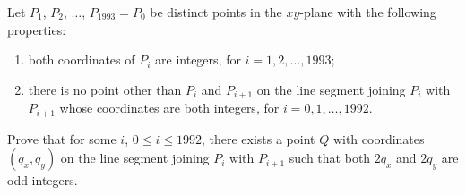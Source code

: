 Let $P_1$, $P_2$, $\ldots$, $P_{1993} = P_0$ be distinct points in the $xy$-plane
with the following properties:
\begin{enumerate}[label=(\roman*)]
	\item both coordinates of $P_i$ are integers, for $i = 1, 2, \ldots, 1993$;
	\item there is no point other than $P_i$ and $P_{i+1}$ on the line segment joining $P_i$ with $P_{i+1}$ whose coordinates are both integers, for $i = 0, 1, \ldots, 1992$.
\end{enumerate}
Prove that for some $i$, $0 \leq i \leq 1992$, there exists a point $Q$ with coordinates $(q_x, q_y)$ on the line segment joining $P_i$ with $P_{i+1}$ such that both $2q_x$ and $2q_y$ are odd integers.
